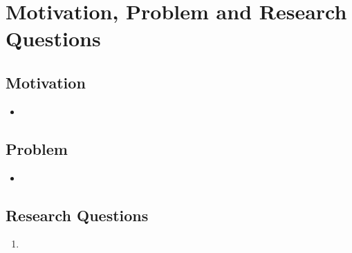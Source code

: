 
\section{Motivation, Problem and Research Questions}

\subsection{Motivation}
\begin{itemize}
  \item 
\end{itemize}


\subsection{Problem}
\begin{itemize}
  \item 
\end{itemize}


\subsection{Research Questions}
\begin{enumerate}
  \item 
\end{enumerate}
